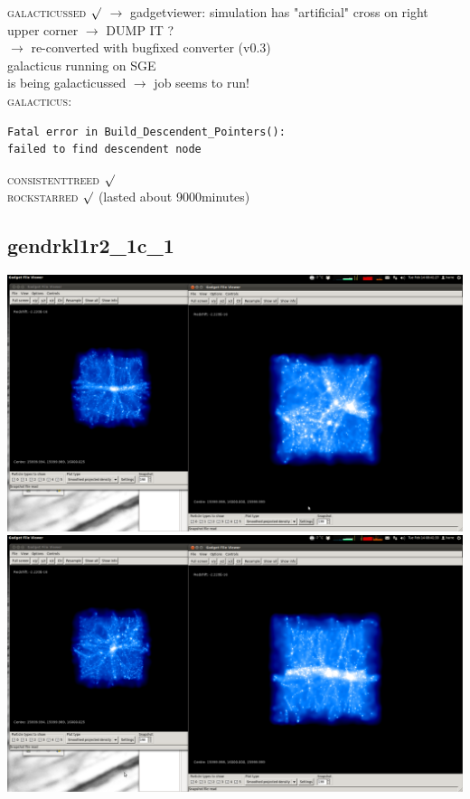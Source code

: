 \textsc{galacticussed} $\surd$
$\rightarrow$ gadgetviewer: simulation has "artificial" cross on right upper corner $\rightarrow$ DUMP IT ? \\
$\rightarrow$ re-converted with bugfixed converter (v0.3) \\
galacticus running on SGE \\
is being galacticussed $\rightarrow$ job seems to run! \\
 \textsc{galacticus}:
 \begin{verbatim}
Fatal error in Build_Descendent_Pointers():
failed to find descendent node 
\end{verbatim}
\textsc{consistenttreed} $\surd$ \\ 
\textsc{rockstarred} $\surd$ (lasted about 9000minutes) \\

% 
%
%
%
%
%
%
%



\newpage
\subsection{gendrkl1r2\_1c\_1}

\includegraphics[scale=0.2]{gendrkl1r2_1c_1/1.png} \\
\includegraphics[scale=0.2]{gendrkl1r2_1c_1/2.png} 

